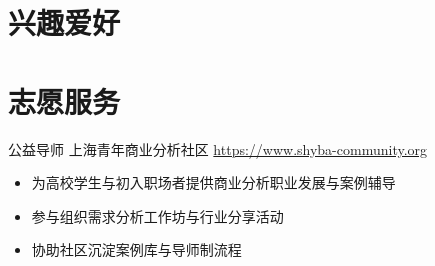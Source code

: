 \documentclass[a4paper, serif, 10pt]{moderncv}
\begin{document}
\section{兴趣爱好}

\section{志愿服务}

        {公益导师}
        {上海青年商业分析社区}
        {\url{https://www.shyba-community.org}}
        {}
        {\begin{itemize}
\item 为高校学生与初入职场者提供商业分析职业发展与案例辅导
\item 参与组织需求分析工作坊与行业分享活动
\item 协助社区沉淀案例库与导师制流程
\end{itemize}}
    
\end{document}
